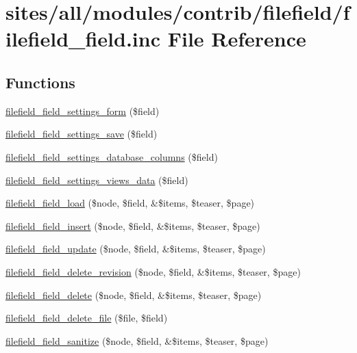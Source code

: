 \hypertarget{filefield__field_8inc}{
\section{sites/all/modules/contrib/filefield/filefield\_\-field.inc File Reference}
\label{filefield__field_8inc}
}
\subsection*{Functions}
\begin{CompactItemize}
\item 
\hyperlink{filefield__field_8inc_469d1a37efae31ac9b3ce301d23b5891}{filefield\_\-field\_\-settings\_\-form} (\$field)
\item 
\hyperlink{filefield__field_8inc_3140908db83ca6d2ec9d8cdabbea3941}{filefield\_\-field\_\-settings\_\-save} (\$field)
\item 
\hyperlink{filefield__field_8inc_3a17fa6008257cf098c9b3ef2a9a2435}{filefield\_\-field\_\-settings\_\-database\_\-columns} (\$field)
\item 
\hyperlink{filefield__field_8inc_735b23726b4588e308eac69da0533a19}{filefield\_\-field\_\-settings\_\-views\_\-data} (\$field)
\item 
\hyperlink{filefield__field_8inc_429bfccbecd02b27fb1760a160abeb5b}{filefield\_\-field\_\-load} (\$node, \$field, \&\$items, \$teaser, \$page)
\item 
\hyperlink{filefield__field_8inc_3f9f2f89477b183d503f9eb59c0551c5}{filefield\_\-field\_\-insert} (\$node, \$field, \&\$items, \$teaser, \$page)
\item 
\hyperlink{filefield__field_8inc_abf42e1b91a512b7155b5f288988a430}{filefield\_\-field\_\-update} (\$node, \$field, \&\$items, \$teaser, \$page)
\item 
\hyperlink{filefield__field_8inc_26f46f57f945be430fa7e9deace57943}{filefield\_\-field\_\-delete\_\-revision} (\$node, \$field, \&\$items, \$teaser, \$page)
\item 
\hyperlink{filefield__field_8inc_4b835916ff7d11082a0b5fc9e6622779}{filefield\_\-field\_\-delete} (\$node, \$field, \&\$items, \$teaser, \$page)
\item 
\hyperlink{filefield__field_8inc_1768f079c1bbd55733755f2f43baf815}{filefield\_\-field\_\-delete\_\-file} (\$file, \$field)
\item 
\hyperlink{filefield__field_8inc_11dd9e9ff671f58111cb7cbc79129819}{filefield\_\-field\_\-sanitize} (\$node, \$field, \&\$items, \$teaser, \$page)
\end{CompactItemize}


